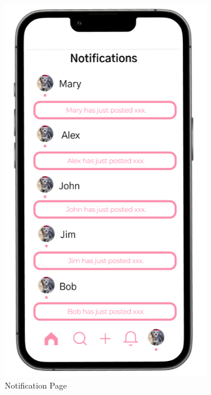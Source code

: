 \begin{figure}[h]
\begin{subfigure}[b]{0.3\textwidth}
    \includegraphics[width=\textwidth]{Figures/notification.png}
    \caption{Notification Page}
    \label{fig:notification}
  \end{subfigure}
  \hfill
  \begin{subfigure}[b]{0.3\textwidth}

\end{subfigure}
\end{figure}
